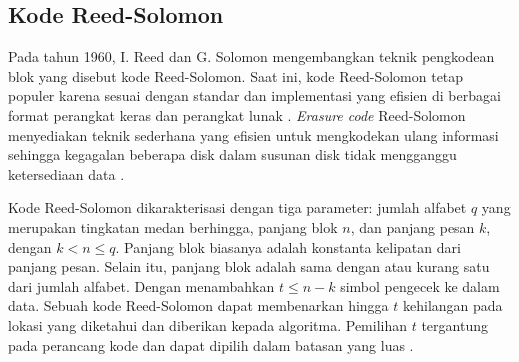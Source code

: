 \subsection{Kode Reed-Solomon}

Pada tahun 1960, I. Reed dan G. Solomon mengembangkan teknik pengkodean blok yang disebut kode Reed-Solomon. Saat ini, kode Reed-Solomon tetap populer karena sesuai dengan standar dan implementasi yang efisien di berbagai format perangkat keras dan perangkat lunak \parencite{minio2022erasure}. \textit{Erasure code} Reed-Solomon menyediakan teknik sederhana yang efisien untuk mengkodekan ulang informasi sehingga kegagalan beberapa disk dalam susunan disk tidak mengganggu ketersediaan data \parencite{manasse2009reed}.



Kode Reed-Solomon dikarakterisasi dengan tiga parameter: jumlah alfabet $q$ yang merupakan tingkatan medan berhingga, panjang blok $n$, dan panjang pesan $k$, dengan $k < n \le q$. Panjang blok biasanya adalah konstanta kelipatan dari panjang pesan. Selain itu, panjang blok adalah sama dengan atau kurang satu dari jumlah alfabet. Dengan menambahkan $t \le n - k$ simbol pengecek ke dalam data. Sebuah kode Reed-Solomon dapat membenarkan hingga $t$ kehilangan pada lokasi yang diketahui dan diberikan kepada algoritma. Pemilihan $t$ tergantung pada perancang kode dan dapat dipilih dalam batasan yang luas \parencite{riley2001introduction}.


